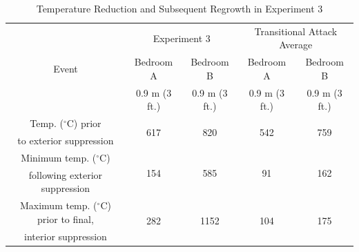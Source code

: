 \documentclass[12pt,oneside]{article}
\begin{document}
\begin{table}[!ht]
    \centering
    \small
    \caption{Temperature Reduction and Subsequent Regrowth in Experiment 3}
    \label{tab:exp_3_temps}
    \begin{tabular}{ccccc}
    \toprule[1.5pt]
 	\multirow{3}{*}{Event} 													& \multicolumn{2}{c}{Experiment 3}		& \multicolumn{2}{c}{Transitional Attack Average}	\\										
 																			&	Bedroom A  				&	Bedroom B				&	Bedroom A 				& Bedroom B	  		\\
 																			&	0.9 m (3 ft.)			&	0.9 m (3 ft.)			&	0.9 m (3 ft.)			& 0.9 m (3 ft.)		\\
 	\midrule 
  	Temp. ($^{\circ}$C) prior 												&	\multirow{2}{*}{617}	&	\multirow{2}{*}{820}	&	\multirow{2}{*}{542}	& \multirow{2}{*}{759}				\\
  	to exterior suppression 												&							&							&							&									\\
  	Minimum temp. ($^{\circ}$C) 											&	\multirow{2}{*}{154}	&	\multirow{2}{*}{585}	&	\multirow{2}{*}{91}		& \multirow{2}{*}{162}				\\
  	following exterior suppression											&							&							&							&									\\
  	Maximum temp. ($^{\circ}$C) prior to final,								&	\multirow{2}{*}{282}	&	\multirow{2}{*}{1152}	&	\multirow{2}{*}{104}	& \multirow{2}{*}{175}				\\
  	 interior suppression													&							&							&							&					\\
 	\bottomrule[1.25pt] 
    \end{tabular}
\end{table}
\end{document}
